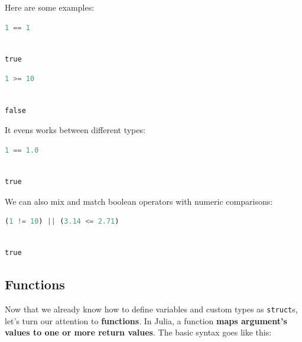 \documentclass[
  notoc %
]{tufte-book}
\newcommand{\passthrough}[1]{#1}
\begin{document}
Here are some examples:

\begin{lstlisting}[language=Julia]
1 == 1
\end{lstlisting}

\begin{lstlisting}[language=Output]

true

\end{lstlisting}

\begin{lstlisting}[language=Julia]
1 >= 10
\end{lstlisting}

\begin{lstlisting}[language=Output]

false

\end{lstlisting}

It evens works between different types:

\begin{lstlisting}[language=Julia]
1 == 1.0
\end{lstlisting}

\begin{lstlisting}[language=Output]

true

\end{lstlisting}

We can also mix and match boolean operators with numeric comparisons:

\begin{lstlisting}[language=Julia]
(1 != 10) || (3.14 <= 2.71)
\end{lstlisting}

\begin{lstlisting}[language=Output]

true

\end{lstlisting}

\hypertarget{sec:function}{%
\subsection{Functions}\label{sec:function}}

Now that we already know how to define variables and custom types as
\passthrough{\lstinline!struct!}s, let's turn our attention to
\textbf{functions}. In Julia, a function \textbf{maps argument's values
to one or more return values}. The basic syntax goes like this:
\end{document}
